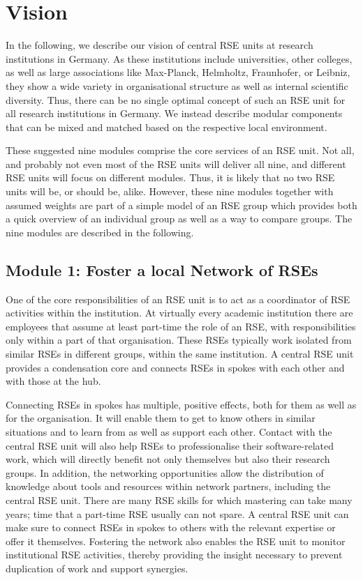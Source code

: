 \documentclass[a4paper]{article}
\begin{document}
\section{Vision}%
\label{sec:vision}
In the following, we describe our vision of central RSE units at research institutions in Germany.
As these institutions include universities, other colleges, as well as large associations like Max-Planck, Helmholtz, Fraunhofer, or Leibniz,
they show a wide variety in organisational structure as well as internal scientific diversity.
Thus, there can be no single optimal concept of such an RSE unit for all research institutions in Germany.
We instead describe modular components that can be mixed and matched based on the respective local environment.

These suggested nine modules comprise the core services of an RSE unit.
Not all, and probably not even most of the RSE units will deliver all nine, and different RSE units will focus on different modules.
Thus, it is likely that no two RSE units will be, or should be, alike.
However, these nine modules together with assumed weights are part of a simple model of an RSE group which provides both a quick overview of an individual group as well as a way to compare groups.
The nine modules are described in the following.

\subsection{Module 1: Foster a local Network of RSEs}%
\label{sec:network}

One of the core responsibilities of an RSE unit is to act as a coordinator of RSE activities within the institution.
At virtually every academic institution there are employees that assume at least part-time the role of an RSE, with responsibilities only within a part of that organisation.
These RSEs typically work isolated from similar RSEs in different groups, within the same institution.
A central RSE unit provides a condensation core and connects RSEs in spokes with each other and with those at the hub.

Connecting RSEs in spokes has multiple, positive effects, both for them as well as for the organisation.
It will enable them to get to know others in similar situations and to learn from as well as support each other.
Contact with the central RSE unit will also help RSEs to professionalise their software-related work, which will directly benefit not only themselves but also their research groups.
In addition, the networking opportunities allow the distribution of knowledge about tools and resources within network partners, including the central RSE unit.
There are many RSE skills for which mastering can take many years; time that a part-time RSE usually can not spare.
A central RSE unit can make sure to connect RSEs in spokes to others with the relevant expertise or offer it themselves.
Fostering the network also enables the RSE unit to monitor institutional RSE activities, thereby providing the insight necessary to prevent duplication of work and support synergies.
\end{document}
